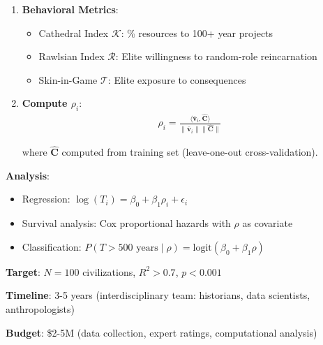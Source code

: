 \documentclass[11pt,a4paper]{article}
\theoremstyle{definition}
\theoremstyle{remark}
\begin{document}
\begin{enumerate}
\begin{protocol}
\begin{enumerate}
    \item \textbf{Behavioral Metrics}:
        \begin{itemize}
            \item Cathedral Index \(\mathcal{K}\): \% resources to 100+ year projects
            \item Rawlsian Index \(\mathcal{R}\): Elite willingness to random-role reincarnation
            \item Skin-in-Game \(\mathcal{T}\): Elite exposure to consequences
        \end{itemize}
    
    \item \textbf{Compute \(\rho_i\)}:
        \begin{align}
        \rho_i = \frac{\langle \bar{\mathbf{v}}_i, \hat{\mathbf{C}} \rangle}{\|\bar{\mathbf{v}}_i\| \|\hat{\mathbf{C}}\|}
        \end{align}
        
        where \(\hat{\mathbf{C}}\) computed from training set (leave-one-out cross-validation).
\end{enumerate}

\textbf{Analysis}:
\begin{itemize}
    \item Regression: \(\log(T_i) = \beta_0 + \beta_1 \rho_i + \epsilon_i\)
    \item Survival analysis: Cox proportional hazards with \(\rho\) as covariate
    \item Classification: \(P(T > 500 \text{ years} \mid \rho) = \text{logit}(\beta_0 + \beta_1 \rho)\)
\end{itemize}

\textbf{Target}: \(N = 100\) civilizations, \(R^2 > 0.7\), \(p < 0.001\)

\textbf{Timeline}: 3-5 years (interdisciplinary team: historians, data scientists, anthropologists)

\textbf{Budget}: \$2-5M (data collection, expert ratings, computational analysis)
\end{protocol}

\begin{figure}[H]
\centering
{}
\end{figure}
\end{enumerate}
\end{document}
